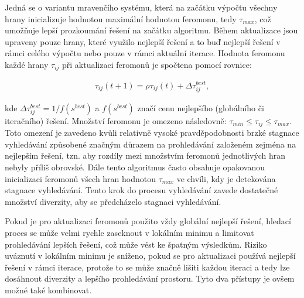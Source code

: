 Jedná se o variantu mravenčího systému, která na začátku výpočtu všechny hrany inicializuje hodnotou maximální hodnotou feromonu, tedy $\tau_{max}$, což umožňuje lepší prozkoumání řešení na začátku algoritmu. Během aktualizace jsou upraveny pouze hrany, které využilo nejlepší řešení a to buď nejlepší řešení v rámci celého výpočtu nebo pouze v rámci aktuální iterace. Hodnota feromonu každé hrany $\tau_{ij}$ při aktualizaci feromonů je spočtena pomocí rovnice:

\begin{align}
    \label{eq:MMAS1}
    \tau_{ij}(t+1) = \rho \tau_{ij}(t) + \Delta \tau_{ij}^{best},
\end{align}

kde $\Delta \tau_{ij}^{best} = 1/f(s^{best})$ a $f(s^{best})$ značí cenu nejlepšího (globálního či iteračního) řešení. Množství feromonu je omezeno následovně: $\tau_{min} \leq \tau_{ij} \leq \tau_{max}$. Toto omezení je zavedeno kvůli relativně vysoké pravděpodobnosti brzké stagnace vyhledávání způsobené značným důrazem na prohledávání založeném zejména na nejlepším řešení, tzn. aby rozdíly mezi množstvím feromonů jednotlivých hran nebyly příliš obrovské. Dále tento algoritmus často obsahuje opakovanou inicializaci feromonů všech hran hodnotou $\tau_{max}$ ve chvíli, kdy je detekována stagnace vyhledávání. Tento krok do procesu vyhledávání zavede dostatečné množství diverzity, aby se předcházelo stagnaci vyhledávání.

Pokud je pro aktualizaci feromonů použito vždy globální nejlepší řešení, hledací proces se může velmi rychle zaseknout v lokálním minimu a limitovat prohledávání lepších řešení, což může vést ke špatným výsledkům. Riziko uváznutí v lokálním minimu je sníženo, pokud se pro aktualizaci používá nejlepší řešení v rámci iterace, protože to se může značně lišiti každou iteraci a tedy lze dosáhnout diverzity a lepšího prohledávání prostoru. Tyto dva přístupy je ovšem možné také kombinovat.


